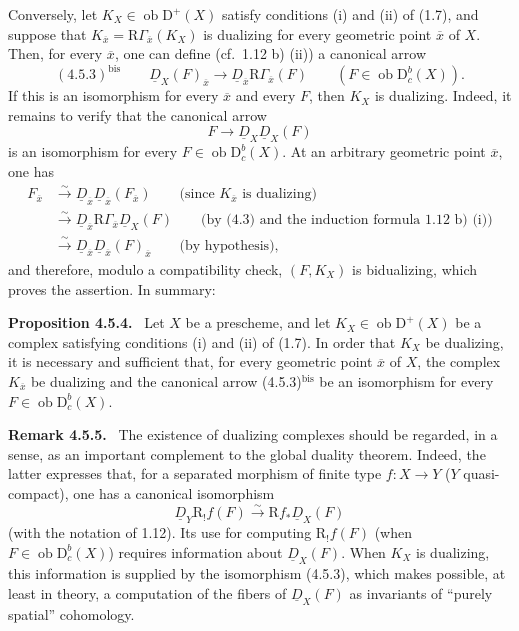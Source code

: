 \documentclass[11pt]{article}
\newenvironment{statement}[1]{\par\medskip\noindent\textbf{#1.}\ }{\par\medskip}
\newcommand{\R}{\mathrm{R}}
\newcommand{\D}{\mathrm{D}}
\newcommand{\ob}{\operatorname{ob}}
\newcommand{\ol}[1]{\overline{#1}}
\begin{document}
Conversely, let $K_X\in\ob\D^+(X)$ satisfy conditions (i) and (ii) of (1.7), and suppose that $K_{\ol{x}}=\R\Gamma_{\ol{x}}(K_X)$ is dualizing for every geometric point $\ol{x}$ of $X$. Then, for every $\ol{x}$, one can define (cf.~1.12 b) (ii)) a canonical arrow
\[
(4.5.3)^{\mathrm{bis}}\qquad \underline{D}_X(F)_{\ol{x}}\longrightarrow \underline{D}_{\ol{x}}\R\Gamma_{\ol{x}}(F)\qquad (F\in\ob\D_c^b(X)).
\]
If this is an isomorphism for every $\ol{x}$ and every $F$, then $K_X$ is dualizing. Indeed, it remains to verify that the canonical arrow
\[
F\longrightarrow \underline{D}_X\underline{D}_X(F)
\]
is an isomorphism for every $F\in\ob\D_c^b(X)$. At an arbitrary geometric point $\ol{x}$, one has
\[
\begin{aligned}
F_{\ol{x}}&\xrightarrow{\sim}\underline{D}_{\ol{x}}\underline{D}_{\ol{x}}(F_{\ol{x}})\qquad\text{(since $K_{\ol{x}}$ is dualizing)}\\
&\xrightarrow{\sim}\underline{D}_{\ol{x}}\R\Gamma_{\ol{x}}\underline{D}_X(F)\qquad\text{(by (4.3) and the induction formula 1.12 b) (i))}\\
&\xrightarrow{\sim}\underline{D}_{\ol{x}}\underline{D}_{\ol{x}}(F)_{\ol{x}}\qquad\text{(by hypothesis)},
\end{aligned}
\]
and therefore, modulo a compatibility check, $(F,K_X)$ is bidualizing, which proves the assertion. In summary:

\begin{statement}{Proposition 4.5.4}
Let $X$ be a prescheme, and let $K_X\in\ob\D^+(X)$ be a complex satisfying conditions (i) and (ii) of (1.7). In order that $K_X$ be dualizing, it is necessary and sufficient that, for every geometric point $\ol{x}$ of $X$, the complex $K_{\ol{x}}$ be dualizing and the canonical arrow (4.5.3)$^{\mathrm{bis}}$ be an isomorphism for every $F\in\ob\D_c^b(X)$.
\end{statement}

\begin{statement}{Remark 4.5.5}
The existence of dualizing complexes should be regarded, in a sense, as an important complement to the global duality theorem. Indeed, the latter expresses that, for a separated morphism of finite type $f:X\to Y$ ($Y$ quasi-compact), one has a canonical isomorphism
\[
\underline{D}_Y\R_!f(F)\xrightarrow{\sim}\R f_*\underline{D}_X(F)
\]
(with the notation of 1.12). Its use for computing $\R_!f(F)$ (when $F\in\ob\D_c^b(X)$) requires information about $\underline{D}_X(F)$. When $K_X$ is dualizing, this information is supplied by the isomorphism (4.5.3), which makes possible, at least in theory, a computation of the fibers of $\underline{D}_X(F)$ as invariants of ``purely spatial'' cohomology.
\end{statement}
\end{document}
